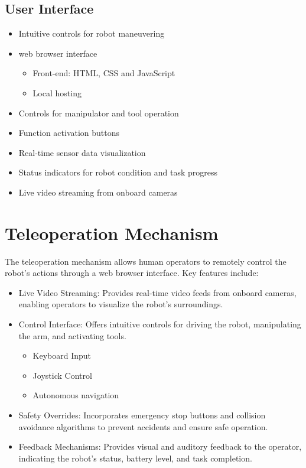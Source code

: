 \documentclass{article}
\begin{document}
\subsection{User Interface}
\begin{itemize}
    \item Intuitive controls for robot maneuvering
    \item web browser interface
    \begin{itemize}
        \item Front-end: HTML, CSS and JavaScript
        \item Local hosting
    \end{itemize}
    \item Controls for manipulator and tool operation
    \item Function activation buttons
    \item Real-time sensor data visualization
    \item Status indicators for robot condition and task progress
    \item Live video streaming from onboard cameras
\end{itemize}


\section{Teleoperation Mechanism}
The teleoperation mechanism allows human operators to remotely control the robot's actions through a web browser interface. Key features include:

\begin{itemize}
    \item Live Video Streaming: Provides real-time video feeds from onboard cameras, enabling operators to visualize the robot's surroundings.
    \item Control Interface: Offers intuitive controls for driving the robot, manipulating the arm, and activating tools.
    \begin{itemize}
        \item Keyboard Input
        \item Joystick Control
        \item Autonomous navigation
    \end{itemize}
    \item Safety Overrides: Incorporates emergency stop buttons and collision avoidance algorithms to prevent accidents and ensure safe operation.
    \item Feedback Mechanisms: Provides visual and auditory feedback to the operator, indicating the robot's status, battery level, and task completion.
\end{itemize}
\end{document}
